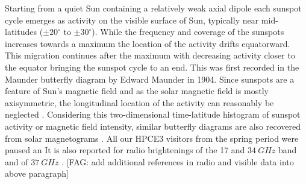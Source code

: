 \documentclass{aa}
\newcommand{\fag}[1]{\textcolor{midpurple}{[FAG: #1]}} %
\begin{document}
  Starting from a quiet Sun containing a relatively weak axial dipole 
  each sunspot cycle emerges as
  activity on the visible surface of Sun, typically near mid-latitudes
  ($\pm20^{\circ}$ to $\pm 30^{\circ}$).
  While the frequency and coverage of the sunspots increases towards a maximum
  the location of the activity drifts equatorward. 
  This migration continues after the maximum with decreasing activity
  closer to the equator bringing the sunspot cycle to an end.
  This was first recorded in the Maunder butterfly diagram by Edward Maunder
  in 1904.
  Since sunspots are a feature of Sun's magnetic field and as the solar
  magnetic field is mostly axisymmetric, 
  the longitudinal location of the
  activity can reasonably be neglected \citep{PBKT06}.
  Considering this two-dimensional time-latitude histogram of sunspot activity
  or magnetic field intensity, similar butterfly 
  diagrams are also recovered from solar magnetograms
  \citep{GHHZ83,VLMCS12,LUSDADM17}.
All our HPCE3 visitors from the spring period were paused an
  It is also reported for radio brightenings of the 17 and $\SI{34}{GHz}$ band
  \citep{Shibasaki13,SCGVPS14} and of $\SI{37}{GHz}$ \citep{metsahovi40}.
  \fag{add additional references in radio and visible data into above paragraph}
 
\end{document}

